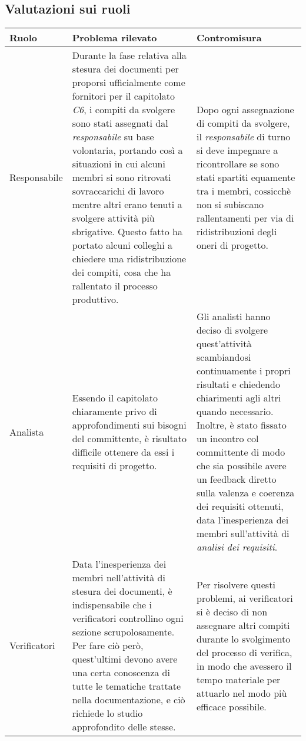 	\subsection{Valutazioni sui ruoli}
	\begin{center}
	\begin{longtable}{|p{3cm}|p{6cm}|p{6cm}|}
	\hline
	\rowcolor{lighter-grayer}
	\textbf{Ruolo} & \textbf{Problema rilevato} & \textbf{Contromisura}\\
	\hline
	\endfirsthead


	\hline
	Responsabile
	 &
	Durante la fase relativa alla stesura dei documenti per proporsi ufficialmente come fornitori per il capitolato \textit{C6}, i compiti da svolgere sono stati assegnati dal \textit{responsabile} su base volontaria, portando così a situazioni in cui alcuni membri si sono ritrovati sovraccarichi di lavoro mentre altri erano tenuti a svolgere attività più sbrigative. Questo fatto ha portato alcuni colleghi a chiedere una ridistribuzione dei compiti, cosa che ha rallentato il processo produttivo. 
	 	& 
Dopo ogni assegnazione di compiti da svolgere, il \textit{responsabile} di turno si deve impegnare a ricontrollare se sono stati spartiti equamente tra i membri, cossicchè non si subiscano rallentamenti per via di ridistribuzioni degli oneri di progetto. \\
	\hline
	
		\hline
	Analista
	 &
	Essendo il capitolato chiaramente privo di approfondimenti sui bisogni del committente, è risultato difficile ottenere da essi i requisiti di progetto.
	 	& 
Gli analisti hanno deciso di svolgere quest'attività scambiandosi continuamente i propri risultati e chiedendo chiarimenti agli altri quando necessario. Inoltre, è stato fissato un incontro col committente di modo che sia possibile avere un feedback diretto sulla valenza e coerenza dei requisiti ottenuti, data l'inesperienza dei membri sull'attività di \textit{analisi dei requisiti}. \\
	\hline
	
		\hline
	Verificatori
	 &
Data l'inesperienza dei membri nell'attività di stesura dei documenti, è indispensabile che i verificatori controllino ogni sezione scrupolosamente. Per fare ciò però, quest'ultimi devono avere una certa conoscenza di tutte le tematiche trattate nella documentazione, e ciò richiede lo studio approfondito delle stesse.	 
	 	& 
Per risolvere questi problemi, ai verificatori si è deciso di non assegnare altri compiti durante lo svolgimento del processo di verifica, in modo che avessero il tempo materiale per attuarlo nel modo più efficace possibile. \\


\end{longtable}
\end{center}

